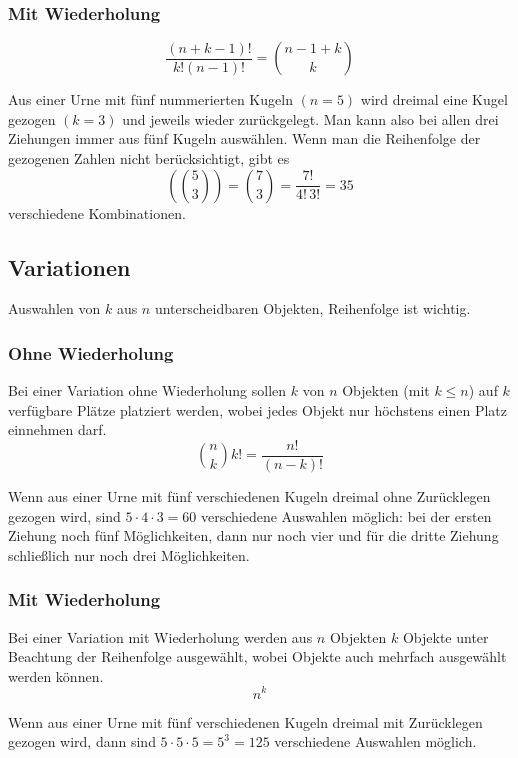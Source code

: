 \subsubsection{Mit Wiederholung}
\[\frac{(n+k-1)!}{k!(n-1)!}=\binom{n-1+k}{k}\]
\begin{bsp}
    Aus einer Urne mit fünf nummerierten Kugeln $(n=5)$ wird dreimal eine Kugel gezogen $(k=3)$ und jeweils wieder zurückgelegt. Man kann also bei allen drei Ziehungen immer aus fünf Kugeln auswählen. Wenn man die Reihenfolge der gezogenen Zahlen nicht berücksichtigt, gibt es
    \[\left(\!\!{5 \choose 3}\!\!\right)={\binom {7}{3}}={\frac {7!}{4!\,3!}}=35\]
        verschiedene Kombinationen. 
\end{bsp}
\subsection{Variationen}
Auswahlen von $k$ aus $n$ unterscheidbaren Objekten, Reihenfolge ist wichtig.
\subsubsection{Ohne Wiederholung}
Bei einer Variation ohne Wiederholung sollen $k$ von $n$ Objekten (mit $k\leq n$) auf $k$ verfügbare Plätze platziert werden, wobei jedes Objekt nur höchstens einen Platz einnehmen darf.
\[\binom{n}{k}k!=\frac{n!}{(n-k)!}\]
\begin{bsp}
Wenn aus einer Urne mit fünf verschiedenen Kugeln dreimal ohne Zurücklegen gezogen wird, sind $5 \cdot 4 \cdot 3 = 60$ verschiedene Auswahlen möglich: bei der ersten Ziehung noch fünf Möglichkeiten, dann nur noch vier und für die dritte Ziehung schließlich nur noch drei Möglichkeiten.
\end{bsp}
\subsubsection{Mit Wiederholung}
Bei einer Variation mit Wiederholung werden aus $n$ Objekten $k$ Objekte unter Beachtung der Reihenfolge ausgewählt, wobei Objekte auch mehrfach ausgewählt werden können.
\[n^k\]
\begin{bsp}
Wenn aus einer Urne mit fünf verschiedenen Kugeln dreimal mit Zurücklegen gezogen wird, dann sind $5 \cdot 5 \cdot 5 = 5^3 = 125$ verschiedene Auswahlen möglich.
\end{bsp}

